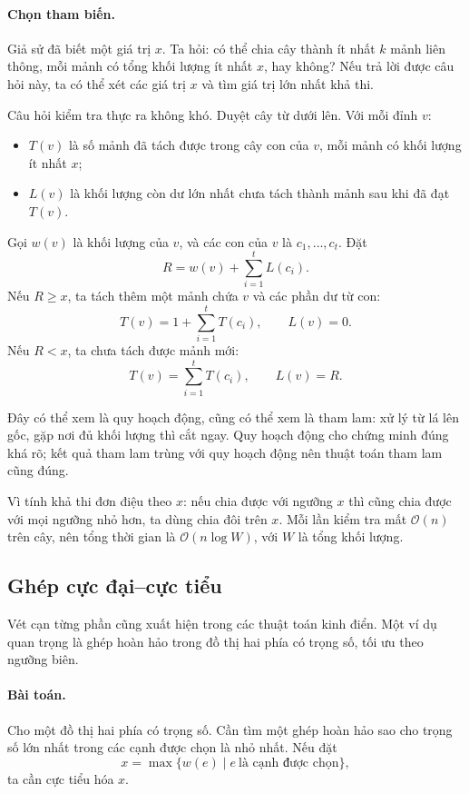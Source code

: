 \documentclass[11pt]{article}
\newcommand{\BigO}{\mathcal{O}}
\begin{document}
\paragraph{Chọn tham biến.}
Giả sử đã biết một giá trị \(x\). Ta hỏi: có thể chia cây thành ít nhất \(k\)
mảnh liên thông, mỗi mảnh có tổng khối lượng ít nhất \(x\), hay không? Nếu
trả lời được câu hỏi này, ta có thể xét các giá trị \(x\) và tìm giá trị lớn
nhất khả thi.

Câu hỏi kiểm tra thực ra không khó. Duyệt cây từ dưới lên. Với mỗi đỉnh \(v\):
\begin{itemize}
  \item \(T(v)\) là số mảnh đã tách được trong cây con của \(v\), mỗi mảnh có
  khối lượng ít nhất \(x\);
  \item \(L(v)\) là khối lượng còn dư lớn nhất chưa tách thành mảnh sau khi
  đã đạt \(T(v)\).
\end{itemize}
Gọi \(w(v)\) là khối lượng của \(v\), và các con của \(v\) là
\(c_1,\ldots,c_t\). Đặt
\[
  R=w(v)+\sum_{i=1}^{t}L(c_i).
\]
Nếu \(R\ge x\), ta tách thêm một mảnh chứa \(v\) và các phần dư từ con:
\[
  T(v)=1+\sum_{i=1}^{t}T(c_i),\qquad L(v)=0.
\]
Nếu \(R<x\), ta chưa tách được mảnh mới:
\[
  T(v)=\sum_{i=1}^{t}T(c_i),\qquad L(v)=R.
\]

Đây có thể xem là quy hoạch động, cũng có thể xem là tham lam: xử lý từ lá
lên gốc, gặp nơi đủ khối lượng thì cắt ngay. Quy hoạch động cho chứng minh
đúng khá rõ; kết quả tham lam trùng với quy hoạch động nên thuật toán tham
lam cũng đúng.

Vì tính khả thi đơn điệu theo \(x\): nếu chia được với ngưỡng \(x\) thì cũng
chia được với mọi ngưỡng nhỏ hơn, ta dùng chia đôi trên \(x\). Mỗi lần kiểm
tra mất \(\BigO(n)\) trên cây, nên tổng thời gian là
\(\BigO(n\log W)\), với \(W\) là tổng khối lượng.

\subsection{Ghép cực đại--cực tiểu}

Vét cạn từng phần cũng xuất hiện trong các thuật toán kinh điển. Một ví dụ
quan trọng là ghép hoàn hảo trong đồ thị hai phía có trọng số, tối ưu theo
ngưỡng biên.

\paragraph{Bài toán.}
Cho một đồ thị hai phía có trọng số. Cần tìm một ghép hoàn hảo sao cho trọng
số lớn nhất trong các cạnh được chọn là nhỏ nhất. Nếu đặt
\[
  x=\max\{w(e)\mid e\ \text{là cạnh được chọn}\},
\]
ta cần cực tiểu hóa \(x\).
\end{document}
